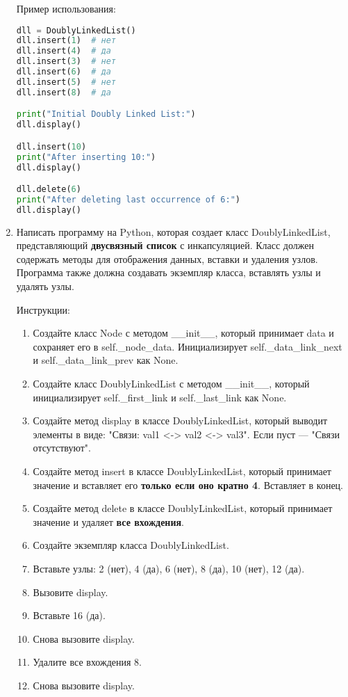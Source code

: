 \begin{enumerate}
Пример использования:
\begin{lstlisting}[language=Python]
dll = DoublyLinkedList()
dll.insert(1)  # нет
dll.insert(4)  # да
dll.insert(3)  # нет
dll.insert(6)  # да
dll.insert(5)  # нет
dll.insert(8)  # да

print("Initial Doubly Linked List:")
dll.display()

dll.insert(10)
print("After inserting 10:")
dll.display()

dll.delete(6)
print("After deleting last occurrence of 6:")
dll.display()
\end{lstlisting}

\item Написать программу на Python, которая создает класс DoublyLinkedList, представляющий \textbf{двусвязный список} с инкапсуляцией. Класс должен содержать методы для отображения данных, вставки и удаления узлов. Программа также должна создавать экземпляр класса, вставлять узлы и удалять узлы.

Инструкции:
\begin{enumerate}
    \item Создайте класс Node с методом \_\_init\_\_, который принимает data и сохраняет его в self.\_node\_data. Инициализирует self.\_data\_link\_next и self.\_data\_link\_prev как None.
    \item Создайте класс DoublyLinkedList с методом \_\_init\_\_, который инициализирует self.\_first\_link и self.\_last\_link как None.
    \item Создайте метод display в классе DoublyLinkedList, который выводит элементы в виде: "Связи: val1 <-> val2 <-> val3". Если пуст — "Связи отсутствуют".
    \item Создайте метод insert в классе DoublyLinkedList, который принимает значение и вставляет его \textbf{только если оно кратно 4}. Вставляет в конец.
    \item Создайте метод delete в классе DoublyLinkedList, который принимает значение и удаляет \textbf{все вхождения}.
    \item Создайте экземпляр класса DoublyLinkedList.
    \item Вставьте узлы: 2 (нет), 4 (да), 6 (нет), 8 (да), 10 (нет), 12 (да).
    \item Вызовите display.
    \item Вставьте 16 (да).
    \item Снова вызовите display.
    \item Удалите все вхождения 8.
    \item Снова вызовите display.
\end{enumerate}


\end{enumerate}
